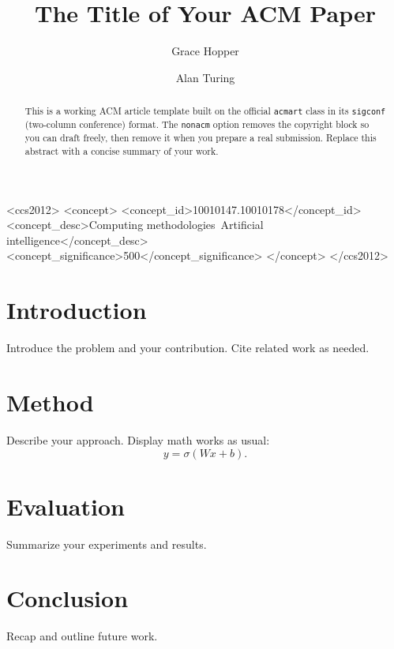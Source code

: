 \documentclass[sigconf,nonacm]{acmart}
\begin{document}
\title{The Title of Your ACM Paper}

\author{Grace Hopper}

\author{Alan Turing}

\begin{abstract}
This is a working ACM article template built on the official \texttt{acmart}
class in its \texttt{sigconf} (two-column conference) format. The \texttt{nonacm}
option removes the copyright block so you can draft freely, then remove it when you
prepare a real submission. Replace this abstract with a concise summary of your
work.
\end{abstract}

\begin{CCSXML}
<ccs2012>
<concept>
<concept_id>10010147.10010178</concept_id>
<concept_desc>Computing methodologies~Artificial intelligence</concept_desc>
<concept_significance>500</concept_significance>
</concept>
</ccs2012>
\end{CCSXML}


\maketitle

\section{Introduction}
Introduce the problem and your contribution. Cite related work as needed.

\section{Method}
Describe your approach. Display math works as usual:
\begin{equation}
  y = \sigma(Wx + b).
\end{equation}

\section{Evaluation}
Summarize your experiments and results.

\section{Conclusion}
Recap and outline future work.
\end{document}
